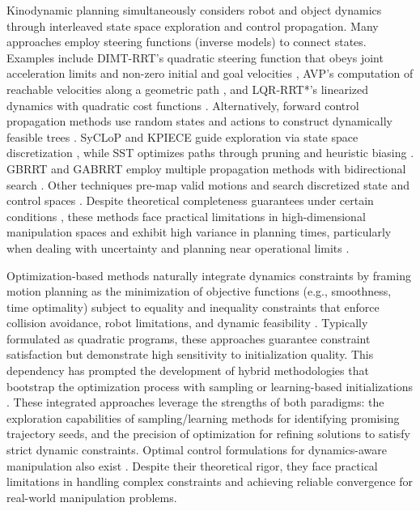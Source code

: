 Kinodynamic planning simultaneously considers robot and object dynamics through interleaved state space exploration and control propagation. Many approaches employ steering functions (inverse models) to connect states. Examples include DIMT-RRT's quadratic steering function that obeys joint acceleration limits and non-zero initial and goal velocities \cite{kunz2014probabilistically}, AVP's computation of reachable velocities along a geometric path \cite{pham2013kinodynamic,johnson2012optimal}, and LQR-RRT*'s linearized dynamics with quadratic cost functions \cite{perez2012lqr,caldwell2018fast}. Alternatively, forward control propagation methods use random states and actions to construct dynamically feasible trees \cite{pasricha2022pokerrt}. SyCLoP and KPIECE guide exploration via state space discretization \cite{plaku2010motion,sucan2011sampling}, while SST optimizes paths through pruning and heuristic biasing \cite{li2016asymptotically}. GBRRT and GABRRT employ multiple propagation methods with bidirectional search \cite{nayak2022bidirectional}. Other techniques pre-map valid motions and search discretized state and control spaces \cite{shome2021asymptotically,bordalba2018randomized}. Despite theoretical completeness guarantees under certain conditions \cite{kleinbort2018probabilistic}, these methods face practical limitations in high-dimensional manipulation spaces and exhibit high variance in planning times, particularly when dealing with uncertainty and planning near operational limits \cite{kingston2018sampling}.

Optimization-based methods naturally integrate dynamics constraints by framing motion planning as the minimization of objective functions (e.g., smoothness, time optimality) subject to equality and inequality constraints that enforce collision avoidance, robot limitations, and dynamic feasibility \cite{kalakrishnan2011stomp,schulman2013finding,park2012itomp,ichnowski2020gomp}.
Typically formulated as quadratic programs, these approaches guarantee constraint satisfaction but demonstrate high sensitivity to initialization quality. This dependency has prompted the development of hybrid methodologies that bootstrap the optimization process with sampling or learning-based initializations \cite{ichnowski2020deep,kuntz2019fast,yan2024impact}. These integrated approaches leverage the strengths of both paradigms: the exploration capabilities of sampling/learning methods for identifying promising trajectory seeds, and the precision of optimization for refining solutions to satisfy strict dynamic constraints.
Optimal control formulations for dynamics-aware manipulation also exist \cite{arrizabalaga2024slosh,kim2014catching}. Despite their theoretical rigor, they face practical limitations in handling complex constraints and achieving reliable convergence for real-world manipulation problems.

